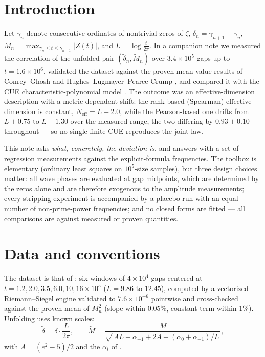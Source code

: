 \documentclass[12pt]{amsart}
\begin{document}
\maketitle

\section{Introduction}

Let $\gamma_n$ denote consecutive ordinates of nontrivial zeros of
$\zeta$, $\delta_n = \gamma_{n+1} - \gamma_n$,
$M_n = \max_{\gamma_n \le t \le \gamma_{n+1}} |Z(t)|$, and
$L = \log \frac{t}{2\pi}$. In a companion note \cite{companion} we
measured the correlation of the unfolded pair
$(\tilde\delta_n, \tilde M_n)$ over $3.4 \times 10^5$ gaps up to
$t = 1.6 \times 10^6$, validated the dataset against the proven mean-value
results of Conrey--Ghosh \cite{CG85} and Hughes--Lugmayer--Pearce-Crump
\cite{HLPC24}, and compared it with the CUE characteristic-polynomial
model \cite{KS00}. The outcome was an effective-dimension description
with a metric-dependent shift: the rank-based (Spearman) effective
dimension is constant, $N_{\mathrm{eff}} = L + 2.0$, while the
Pearson-based one drifts from $L+0.75$ to $L+1.30$ over the measured
range, the two differing by $0.93 \pm 0.10$ throughout --- so no single
finite CUE reproduces the joint law.

This note asks \emph{what, concretely, the deviation is}, and answers with
a set of regression measurements against the explicit-formula frequencies.
The toolbox is elementary (ordinary least squares on $10^5$-size samples),
but three design choices matter: all wave phases are evaluated at gap
midpoints, which are determined by the zeros alone and are therefore
exogenous to the amplitude measurements; every stripping experiment is
accompanied by a placebo run with an equal number of non-prime-power
frequencies; and no closed forms are fitted --- all comparisons are
against measured or proven quantities.

\section{Data and conventions}

The dataset is that of \cite{companion}: six windows of $4\times10^4$
gaps centered at $t = 1.2, 2.0, 3.5, 6.0, 10, 16 \times 10^5$
($L = 9.86$ to $12.45$), computed by a vectorized Riemann--Siegel engine
validated to $7.6\times10^{-6}$ pointwise and cross-checked against the
proven mean of $M_n^2$ (slope within $0.05\%$, constant term within
$1\%$). Unfolding uses known scales:
\[
\tilde\delta = \delta \cdot \frac{L}{2\pi}, \qquad
\tilde M = \frac{M}{\sqrt{\,AL + \alpha_{-1} + 2A + (\alpha_0+\alpha_{-1})/L\,}},
\]
with $A = (e^2-5)/2$ and the $\alpha_i$ of \cite{HLPC24}.
\end{document}
